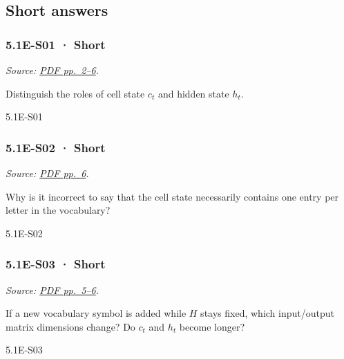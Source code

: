 \subsection{Short answers}\label{short-answers-13}

\noindent\begin{minipage}{\linewidth}

\subsubsection{5.1E-S01 · Short}\label{e-s01-short}

\emph{Source:
\href{../Lecture\%20Slides/5.1.\%20Extra\%20Material.pdf\#page=2}{PDF
pp.~2--6}.}

Distinguish the roles of cell state \(c_t\) and hidden state \(h_t\).

\begin{solution}[20mm]{5.1E-S01}

\end{solution}
\end{minipage}\par\medskip

\noindent\begin{minipage}{\linewidth}

\subsubsection{5.1E-S02 · Short}\label{e-s02-short}

\emph{Source:
\href{../Lecture\%20Slides/5.1.\%20Extra\%20Material.pdf\#page=6}{PDF
pp.~6}.}

Why is it incorrect to say that the cell state necessarily contains one
entry per letter in the vocabulary?

\begin{solution}[20mm]{5.1E-S02}

\end{solution}
\end{minipage}\par\medskip

\noindent\begin{minipage}{\linewidth}

\subsubsection{5.1E-S03 · Short}\label{e-s03-short}

\emph{Source:
\href{../Lecture\%20Slides/5.1.\%20Extra\%20Material.pdf\#page=5}{PDF
pp.~5--6}.}

If a new vocabulary symbol is added while \(H\) stays fixed, which
input/output matrix dimensions change? Do \(c_t\) and \(h_t\) become
longer?

\begin{solution}[20mm]{5.1E-S03}

\end{solution}
\end{minipage}\par\medskip

